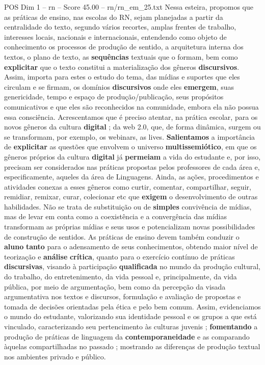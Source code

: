 \begin{textsample}{POS Dim 1 – rn – Score 45.00 – rn/rn\_em\_25.txt}
Nessa esteira, propomos que as práticas de ensino, nas escolas do RN, sejam planejadas a partir da centralidade do texto, segundo vários recortes, amplas frentes de trabalho, interesses locais, nacionais e internacionais, entendendo como objeto de conhecimento os processos de produção de sentido, a arquitetura interna dos textos, o plano de texto, as \textbf{sequências} textuais que o formam, bem como \textbf{explicitar} que o texto constitui a materialização dos gêneros \textbf{discursivos}.
Assim, importa para estes o estudo do tema, das mídias e suportes que eles circulam e se firmam, os domínios \textbf{discursivos} onde eles \textbf{emergem}, suas genericidade, tempo e espaço de produção/publicação, seus propósitos comunicativos e que eles são reconhecidos na comunidade, embora ela não possua essa consciência.
Acrescentamos que é preciso atentar, na prática escolar, para os novos gêneros da cultura \textbf{digital} ; da web 2.0, que, de forma dinâmica, surgem ou se transformam, por exemplo, os webinars, as lives. \textbf{Salientamos} a importância de \textbf{explicitar} as questões que envolvem o universo \textbf{multissemiótico}, em que os gêneros próprios da cultura \textbf{digital} já \textbf{permeiam} a vida do estudante e, por isso, precisam ser considerados nas práticas propostas pelos professores de cada área e, especificamente, aqueles da área de Linguagens.
Ainda, as ações, procedimentos e atividades conexas a esses gêneros como curtir, comentar, compartilhar, seguir, remidiar, remixar, curar, colecionar etc que \textbf{exigem} o desenvolvimento de outras habilidades.
Não se trata de substituição ou de \textbf{simples} convivência de mídias, mas de levar em conta como a coexistência e a convergência das mídias transformam as próprias mídias e seus usos e potencializam novas possibilidades de construção de sentidos.
As práticas de ensino devem também conduzir o \textbf{aluno} \textbf{tanto} para o adensamento de seus conhecimentos, obtendo maior nível de teorização e \textbf{análise} \textbf{crítica}, quanto para o exercício contínuo de práticas \textbf{discursivas}, visando à participação \textbf{qualificada} no mundo da produção cultural, do trabalho, do entretenimento, da vida pessoal e, principalmente, da vida pública, por meio de argumentação, bem como da percepção da visada argumentativa nos textos e discursos, formulação e avaliação de propostas e tomada de decisões orientadas pela ética e pelo bem comum.
Assim, evidenciamos o mundo do estudante, valorizando sua identidade pessoal e os grupos a que está vinculado, caracterizando seu pertencimento às culturas juvenis ; \textbf{fomentando} a produção de práticas de linguagem da \textbf{contemporaneidade} e as comparando àquelas compartilhadas no passado ; mostrando as diferenças de produção textual nos ambientes privado e público.

\end{textsample}
